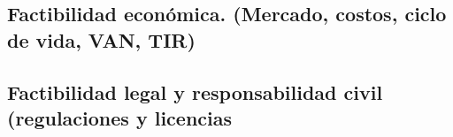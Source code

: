   \newpage


  \subsection{Factibilidad económica. (Mercado, costos, ciclo de vida, VAN, TIR)}  

  \newpage



  \subsection{Factibilidad legal y responsabilidad civil (regulaciones y licencias}  

  \newpage


